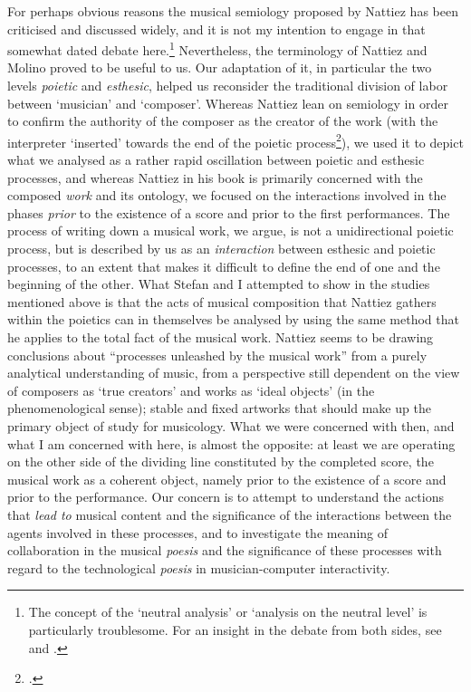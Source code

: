 \label{sec:1-par:2}
For perhaps obvious reasons the musical semiology proposed by Nattiez has been criticised and discussed widely, and it is not my intention to engage in that somewhat dated debate here.\footnote{The   concept of the `neutral analysis' or `analysis on the neutral level'   is particularly troublesome. For an insight in the debate from both   sides, see \cite{nat89} and \cite{dunsby83}.} Nevertheless, the terminology of Nattiez and Molino proved to be useful to us. Our adaptation of it, in particular the two levels \emph{poietic} and \emph{esthesic}, helped us reconsider the traditional division of labor between `musician' and `composer'. Whereas Nattiez lean on semiology in order to confirm the authority of the composer as the creator of the work (with the interpreter `inserted' towards the end of the poietic process\footcite[See][73]{nattiez}), we used it to depict what we analysed as a rather rapid oscillation between poietic and esthesic processes, and whereas Nattiez in his book  is primarily concerned with the composed \emph{work} and its ontology, we focused on the interactions involved in the phases \emph{prior} to the existence of a score and prior to the first performances. The process of writing down a musical work, we argue, is not a unidirectional poietic process, but is described by us as an \emph{interaction} between esthesic and poietic processes, to an extent that makes it difficult to define the end of one and the beginning of the other. What Stefan and I attempted to show in the studies mentioned above is that the acts of musical composition that Nattiez gathers within the poietics can in themselves be analysed by using the same method that he applies to the total fact of the musical work. Nattiez seems to be drawing conclusions about ``processes unleashed by the musical work'' from a purely analytical understanding of music, from a perspective still dependent on the view of composers as `true creators' and works as `ideal objects' (in the phenomenological sense); stable and fixed artworks that should make up the primary object of study for musicology. What we were concerned with then, and what I am concerned with here, is almost the opposite: at least we are operating on the other side of the dividing line constituted by the completed score, the musical work as a coherent object, namely prior to the existence of a score and prior to the performance. Our concern is to attempt to understand the actions that \emph{lead to} musical content and the significance of the interactions between the agents involved in these processes, and to investigate the meaning of collaboration in the musical \emph{poesis} and the significance of these processes with regard to the technological \emph{poesis} in musician-computer interactivity.

